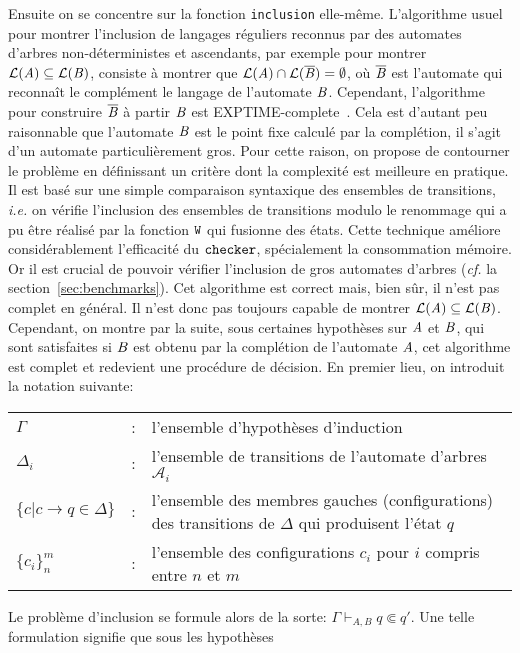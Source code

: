 Ensuite on se concentre sur la fonction \lstinline!inclusion! elle-même. 
L'algorithme usuel pour montrer l'inclusion de langages réguliers reconnus
par des automates d'arbres non-déterministes et ascendants, par exemple
pour montrer $\mathcal{L}(\mathit A) \subseteq \mathcal{L}(\mathit B)$, consiste à montrer que $\mathcal{L}(\mathit A) \cap
\mathcal{L}(\overline{\mathit B}) =\emptyset$, où $\overline{\mathit B}$ est l'automate qui reconnaît le complément 
le langage de l'automate $\mathit B$. Cependant, l'algorithme pour construire $\overline{\mathit B}$ à partir
$\mathit B$ est EXPTIME-complete~\cite{TATA}. Cela est d'autant peu raisonnable que l'automate $\mathit B$ est
le point fixe calculé par la complétion, il s'agit d'un automate particulièrement gros.
Pour cette raison, on propose de contourner le problème en définissant un critère dont
la complexité est meilleure en pratique. Il est basé sur une simple comparaison syntaxique
des ensembles de transitions, \textit{i.e.} on vérifie l'inclusion des ensembles de transitions
modulo le renommage qui a pu être réalisé par la fonction $\mathtt{W}$ qui fusionne des états.
Cette technique améliore considérablement l'efficacité du $\mathtt{checker}$, spécialement la consommation
mémoire. Or il est crucial de pouvoir vérifier l'inclusion de gros automates d'arbres (\textit{cf.}
la section~\ref{sec:benchmarks}). Cet algorithme est correct mais, bien sûr, il n'est pas 
complet en général. Il n'est donc pas toujours capable de montrer $\mathcal{L}(\mathit A) \subseteq \mathcal{L}(\mathit B)$.
Cependant, on montre par la suite, sous certaines hypothèses sur $\mathit A$ et $\mathit B$, qui sont satisfaites
si $\mathit B$ est obtenu par la complétion de l'automate $\mathit A$, cet algorithme est complet et redevient une procédure de
décision. En premier lieu, on introduit la notation suivante:
{\small
\begin{center}
  \begin{tabular}[c]{lcp{10cm}}
    $\Gamma$    & : & l'ensemble d'hypothèses d'induction\\
    $\Delta_i$  & : & l'ensemble de transitions de l'automate d'arbres $\mathcal{A}_i$\\
    $\{c|c \rightarrow q \in \Delta\}$ & : & l'ensemble des membres gauches (configurations) des transitions de $\Delta$ qui produisent l'état $q$\\
    $\{c_i\}_n^m$ & : & l'ensemble des configurations $c_i$ pour $i$ compris entre $n$ et $m$\\
  \end{tabular}
\end{center}
} Le problème d'inclusion se formule alors de la sorte: ${\Gamma
  \vdash_{A, B} q \Subset q'}$. Une telle formulation signifie que sous les hypothèses

